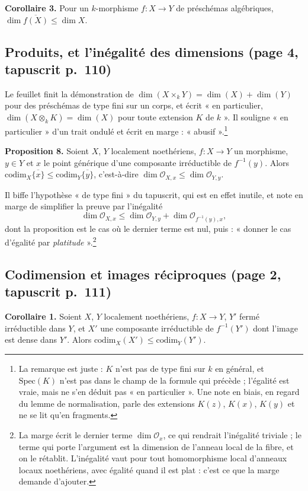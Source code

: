 \documentclass[11pt,a4paper]{article}
\begin{document}
\textbf{Corollaire 3.} Pour un $k$-morphisme $f : X \to Y$ de préschémas
algébriques, $\dim \overline{f(X)} \leq \dim X$.

\subsection*{Produits, et l'inégalité des dimensions (page 4, tapuscrit p.~110)}

Le feuillet finit la démonstration de $\dim(X \times_{k} Y) = \dim(X) +
\dim(Y)$ pour des préschémas de type fini sur un corps, et écrit « en
particulier, $\dim(X \otimes_{k} K) = \dim(X)$ pour toute extension $K$ de
$k$ ». Il souligne « en particulier » d'un trait ondulé et écrit en marge :
« abusif ».\footnote{La remarque est juste : $K$ n'est pas de type fini sur
$k$ en général, et $\mathrm{Spec}(K)$ n'est pas dans le champ de la formule
qui précède ; l'égalité est vraie, mais ne s'en déduit pas « en particulier ».
Une note en biais, en regard du lemme de normalisation, parle des extensions
$K(z)$, $K(x)$, $K(y)$ et ne se lit qu'en fragments.}

\textbf{Proposition 8.} Soient $X$, $Y$ localement noethériens, $f : X \to Y$ un
morphisme, $y \in Y$ et $x$ le point générique d'une composante irréductible
de $f^{-1}(y)$. Alors $\mathrm{codim}_{X}\overline{\{x\}} \leq
\mathrm{codim}_{Y}\overline{\{y\}}$, c'est-à-dire
$\dim \mathcal{O}_{X,x} \leq \dim \mathcal{O}_{Y,y}$.

Il biffe l'hypothèse « de type fini » du tapuscrit, qui est en effet
inutile, et note en marge de simplifier la preuve par l'inégalité
\[
  \dim \mathcal{O}_{X,x} \leq \dim \mathcal{O}_{Y,y} + \dim \mathcal{O}_{f^{-1}(y),x},
\]
dont la proposition est le cas où le dernier terme est nul, puis :
« donner le cas d'égalité par \emph{platitude} ».\footnote{La marge écrit le
dernier terme $\dim \mathcal{O}_{x}$, ce qui rendrait l'inégalité triviale ;
le terme qui porte l'argument est la dimension de l'anneau local de la fibre,
et on le rétablit. L'inégalité vaut pour tout homomorphisme local d'anneaux
locaux noethériens, avec égalité quand il est plat : c'est ce que
la marge demande d'ajouter.}

\subsection*{Codimension et images réciproques (page 2, tapuscrit p.~111)}

\textbf{Corollaire 1.} Soient $X$, $Y$ localement noethériens, $f : X \to Y$,
$Y'$ fermé irréductible dans $Y$, et $X'$ une composante irréductible de
$f^{-1}(Y')$ dont l'image est dense dans $Y'$. Alors
$\mathrm{codim}_{X}(X') \leq \mathrm{codim}_{Y}(Y')$.
\end{document}

